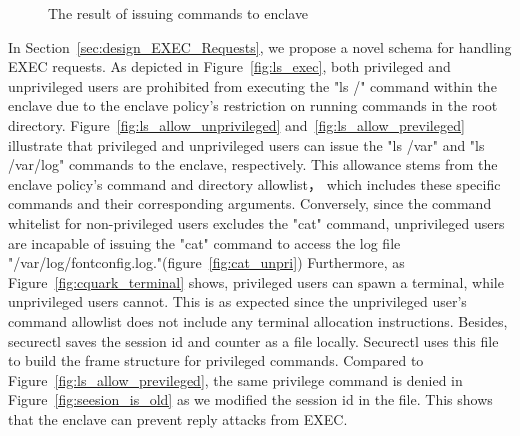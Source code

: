 \begin{figure}[!htb]

    
    \caption[The result of issuing  commands to enclave]{The result of issuing  commands to enclave\label{fig:exec}}
\end{figure}


In Section~\ref*{sec:design_EXEC_Requests}, we propose a novel schema for handling EXEC requests. As depicted in Figure~\ref{fig:ls_exec}, both privileged and unprivileged users are prohibited from executing the "ls /" command within the enclave due to the enclave policy's restriction on running commands in the root directory. 
Figure~\ref{fig:ls_allow_unprivileged} and~\ref{fig:ls_allow_previleged} illustrate that privileged and unprivileged users can issue the "ls /var" and "ls /var/log" commands to the enclave, respectively. This allowance stems from the enclave policy's command and directory allowlist， which 
includes these specific commands and their corresponding arguments. Conversely, since the command whitelist for non-privileged users excludes the "cat" command, unprivileged users are incapable of issuing the "cat" command to access the log file "/var/log/fontconfig.log."(figure~\ref{fig:cat_unpri}) 
Furthermore, as Figure~\ref{fig:cquark_terminal} shows, privileged users can spawn a terminal, while unprivileged users cannot. 
This is as expected since the unprivileged user's command allowlist does not include any terminal allocation instructions. 
Besides, securectl saves the session id and counter as a file locally. Securectl uses this file to build the frame structure for privileged commands. Compared to Figure~\ref{fig:ls_allow_previleged}, the same privilege command is denied in Figure~\ref{fig:seesion_is_old} as we modified the session 
id in the file. This shows that the enclave can prevent reply attacks from EXEC.


